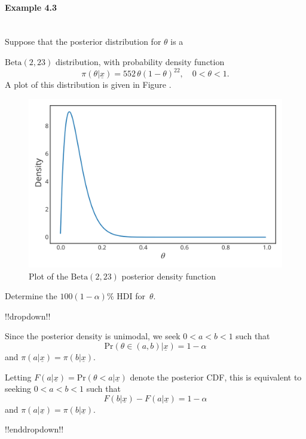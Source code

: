 \paragraph{Example 4.3}{~\\
Suppose that the posterior distribution for $\theta$ is a

$\mathrm{Beta}(2,23)$ distribution, with probability density function
$$
\pi(\theta|\underline{x})=552\,\theta(1-\theta)^{22}, \quad 0<\theta<1.
$$
A plot of this distribution is given in Figure .
\begin{figure}[h!]

\includegraphics{images/betaposterior2.svg}
\caption{Plot of the $\mathrm{Beta}(2,23)$ posterior density function}


\end{figure}
Determine the $100(1-\alpha)\%$ HDI for~$\theta$.

!!dropdown!!

Since the posterior density is unimodal, we seek $ 0 < a < b < 1 $ such that
    $$ \mathrm{Pr}(\theta \in (a,b)|\underline{x}) = 1 - \alpha $$
    and $\pi(a|\underline{x}) = \pi(b|\underline{x})$.
    
    Letting $F(a|\underline{x}) = \mathrm{Pr}(\theta < a|\underline{x})$ denote the posterior CDF, this is equivalent to  seeking $0<a<b<1$ such that
    $$ F(b|\underline{x}) - F(a|\underline{x}) = 1 - \alpha$$
    and $\pi(a|\underline{x}) = \pi(b|\underline{x})$.

!!enddropdown!!
\clearpage

}
